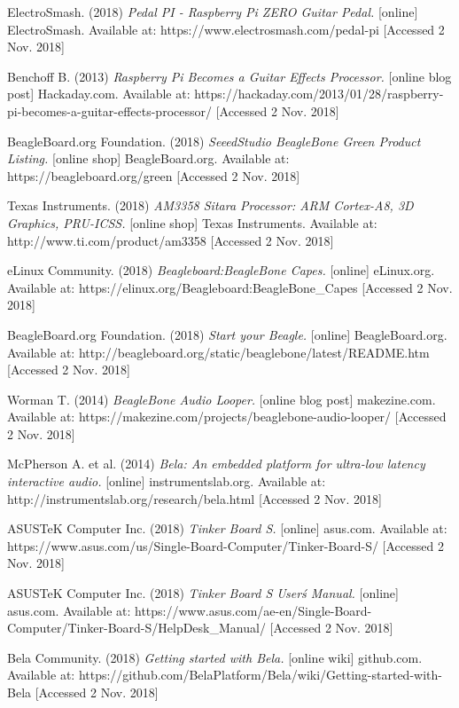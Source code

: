 \documentclass[journal,onecolumn,draftclsnofoot]{IEEEtran}
\begin{document}
\begin{thebibliography}{1}
 ElectroSmash. (2018) \textit{Pedal PI - Raspberry Pi ZERO Guitar Pedal.} [online] ElectroSmash. Available at: https://www.electrosmash.com/pedal-pi [Accessed 2 Nov. 2018]
 
 Benchoff B. (2013) \textit{Raspberry Pi Becomes a Guitar Effects Processor.} [online blog post] Hackaday.com. Available at: https://hackaday.com/2013/01/28/raspberry-pi-becomes-a-guitar-effects-processor/ [Accessed 2 Nov. 2018]

 BeagleBoard.org Foundation. (2018) \textit{SeeedStudio BeagleBone Green Product Listing.} [online shop] BeagleBoard.org. Available at: https://beagleboard.org/green [Accessed 2 Nov. 2018]

 Texas Instruments. (2018) \textit{AM3358 Sitara Processor: ARM Cortex-A8, 3D Graphics, PRU-ICSS.} [online shop] Texas Instruments. Available at: http://www.ti.com/product/am3358 [Accessed 2 Nov. 2018]

 eLinux Community. (2018) \textit{Beagleboard:BeagleBone Capes.} [online] eLinux.org. Available at: https://elinux.org/Beagleboard:BeagleBone\_Capes [Accessed 2 Nov. 2018]

BeagleBoard.org Foundation. (2018) \textit{Start your Beagle.} [online] BeagleBoard.org. Available at: http://beagleboard.org/static/beaglebone/latest/README.htm [Accessed 2 Nov. 2018]

 Worman T. (2014) \textit{BeagleBone Audio Looper.} [online blog post] makezine.com. Available at: https://makezine.com/projects/beaglebone-audio-looper/ [Accessed 2 Nov. 2018]

 McPherson A. et al. (2014) \textit{Bela: An embedded platform for ultra-low latency interactive audio.} [online] instrumentslab.org. Available at: http://instrumentslab.org/research/bela.html [Accessed 2 Nov. 2018]
 
ASUSTeK Computer Inc. (2018) \textit{Tinker Board S.} [online] asus.com. Available at: https://www.asus.com/us/Single-Board-Computer/Tinker-Board-S/ [Accessed 2 Nov. 2018]

ASUSTeK Computer Inc. (2018) \textit{Tinker Board S User\'s Manual.} [online] asus.com. Available at: https://www.asus.com/ae-en/Single-Board-Computer/Tinker-Board-S/HelpDesk\_Manual/ [Accessed 2 Nov. 2018]

Bela Community. (2018) \textit{Getting started with Bela.} [online wiki] github.com. Available at: https://github.com/BelaPlatform/Bela/wiki/Getting-started-with-Bela [Accessed 2 Nov. 2018]


\end{thebibliography}
\end{document}
